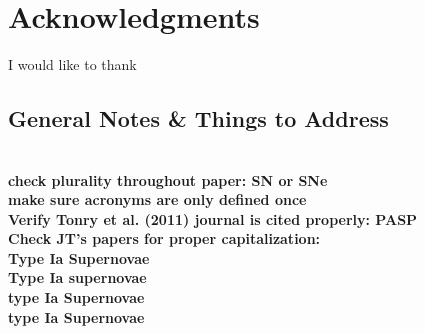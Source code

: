 \documentclass[aps,prb,twocolumn,superscriptaddress]{revtex4-1}
\begin{document}
\section*{Acknowledgments}
I would like to thank   %



\clearpage
\begin{widetext} %
 \section{General Notes \& Things to Address}
 \\
 {\bf check plurality throughout paper: SN or SNe\\}
 {\bf make sure acronyms are only defined once\\}
 {\bf Verify Tonry et al. (2011) journal is cited properly: PASP\\}
 {\bf Check JT's papers for proper capitalization:\\
 \indent Type Ia Supernovae\\
 \indent Type Ia supernovae\\
 \indent type Ia Supernovae\\
 \indent type Ia Supernovae\\}
\end{widetext}

\newpage

\newpage
\end{document}
